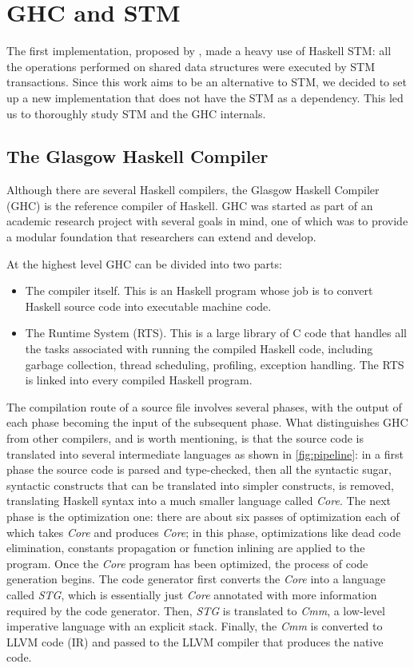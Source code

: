 
\chapter{GHC and STM}
\label{chap:ghc}

The first implementation, proposed by \citet{Toneguzzo}, made a heavy use of Haskell STM: all the operations performed on shared data structures were executed by STM transactions. Since this work aims to be an alternative to STM, we decided to set up a new implementation that does not have the STM as a dependency. This led us to thoroughly study STM and the GHC internals.


\section{The Glasgow Haskell Compiler}
Although there are several Haskell compilers, the Glasgow Haskell Compiler (GHC) is the reference compiler of Haskell. GHC was started as part of an academic research project with several goals in mind, one of which was to provide a modular foundation that researchers can extend and develop.

At the highest level GHC can be divided into two parts:
\begin{itemize}
 \item The compiler itself. This is an Haskell program whose job is to convert Haskell source code into executable machine code.
 \item The Runtime System (RTS). This is a large library of C code that handles all the tasks associated with running the compiled Haskell code, including garbage collection, thread scheduling, profiling, exception handling. The RTS is linked into every compiled Haskell program.
 \end{itemize}
The compilation route of a source file involves several phases, with the output of each phase becoming the input of the subsequent phase. What distinguishes GHC from other compilers, and is worth mentioning, is that the source code is translated into several intermediate languages as shown in \cref{fig:pipeline}: in a first phase the source code is parsed and type-checked, then all the syntactic sugar, \ie syntactic constructs that can be translated into simpler constructs, is removed, translating Haskell syntax into a much smaller language called \emph{Core}. The next phase is the optimization one: there are about six passes of optimization each of which takes \emph{Core} and produces \emph{Core}; in this phase, optimizations like dead code elimination, constants propagation or function inlining are applied to the program. Once the \emph{Core} program has been optimized, the process of code generation begins. The code generator first converts the \emph{Core} into a language called \emph{STG}, which is essentially just \emph{Core} annotated with more information required by the code generator. Then, \emph{STG} is translated to \emph{Cmm}, a low-level imperative language with an explicit stack. Finally, the \emph{Cmm} is converted to LLVM code (IR) and passed to the LLVM compiler that produces the native code.

